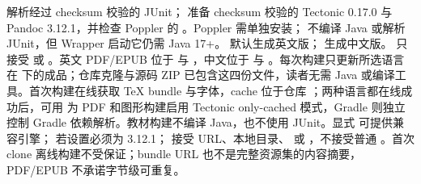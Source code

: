  解析经过 checksum 校验的 JUnit； 准备 checksum 校验的 Tectonic 0.17.0 与 Pandoc 3.12.1，并检查 Poppler 的 。Poppler 需单独安装； 不编译 Java 或解析 JUnit，但 Wrapper 启动它仍需 Java 17+。 默认生成英文版； 生成中文版。 只接受  或 。英文 PDF/EPUB 位于  与 ，中文位于  与 。每次构建只更新所选语言在  下的成品；仓库克隆与源码 ZIP 已包含这四份文件，读者无需 Java 或编译工具。首次构建在线获取 TeX bundle 与字体，cache 位于仓库 ；两种语言都在线成功后，可用  为 PDF 和图形构建启用 Tectonic only-cached 模式，Gradle  则独立控制 Gradle 依赖解析。教材构建不编译 Java，也不使用 JUnit。显式  可提供兼容引擎； 若设置必须为 3.12.1； 接受 URL、本地目录、 或 ，不接受普通 。首次 clone 离线构建不受保证；bundle URL 也不是完整资源集的内容摘要，PDF/EPUB 不承诺字节级可重复。